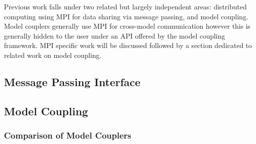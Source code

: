 Previous work falls under two related but largely independent areas: distributed
computing using MPI for data sharing via message passing, and model coupling.
Model couplers generally use MPI for cross-model communication however this is
generally hidden to the user under an API offered by the model coupling
framework. MPI specific work will be discussed followed by a section dedicated
to related work on model coupling.

\subsection{Message Passing Interface}


\subsection{Model Coupling}


\subsubsection{Comparison of Model Couplers}

